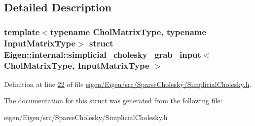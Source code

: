 \subsection{Detailed Description}
\subsubsection*{template$<$typename Chol\+Matrix\+Type, typename Input\+Matrix\+Type$>$\newline
struct Eigen\+::internal\+::simplicial\+\_\+cholesky\+\_\+grab\+\_\+input$<$ Chol\+Matrix\+Type, Input\+Matrix\+Type $>$}



Definition at line \hyperlink{eigen_2_eigen_2src_2_sparse_cholesky_2_simplicial_cholesky_8h_source_l00022}{22} of file \hyperlink{eigen_2_eigen_2src_2_sparse_cholesky_2_simplicial_cholesky_8h_source}{eigen/\+Eigen/src/\+Sparse\+Cholesky/\+Simplicial\+Cholesky.\+h}.



The documentation for this struct was generated from the following file\+:\begin{DoxyCompactItemize}
\item 
eigen/\+Eigen/src/\+Sparse\+Cholesky/\+Simplicial\+Cholesky.\+h\end{DoxyCompactItemize}
